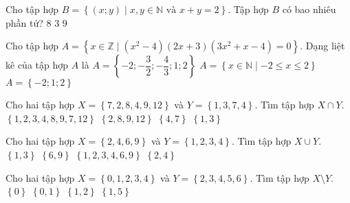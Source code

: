 \begin{ex}%
	Cho tập hợp $B = \left\{(x;y) \mid  x,y \in \mathbb{N}  \text{ và } x+y= 2\right\}$. Tập hợp $B$ có bao nhiêu phần tử?
	{$8$}
	{\True $3$}
	{$9$}
\end{ex}

\begin{ex}%
	Cho tập hợp $A = \left\{x \in \mathbb{Z} \mid (x^2-4)(2x+3)(3x^2+x-4) = 0\right\}$. Dạng liệt kê của tập hợp $A$ là
	{$A  = \left\{-2;-\dfrac{3}{2};-\dfrac{4}{3};1;2\right\} $}
	{$A  = \left\{x \in \mathbb{N} \mid -2 \le x \le 2 \right\} $}
	{\True $A  = \left\{-2;1;2\right\} $}
\end{ex}

\begin{ex}%
	Cho hai tập hợp $X=\left\{ 7, 2, 8, 4, 9, 12 \right\}$ và $Y=\left\{ 1, 3, 7, 4 \right\}$. Tìm tập hợp $X\cap Y$.
	\choice
	{$\left\{ 1, 2, 3, 4, 8, 9, 7, 12 \right\}$}
	{$\left\{ 2, 8, 9, 12 \right\}$}
	{\True $\left\{ 4, 7 \right\}$}
	{$\left\{ 1, 3 \right\}$}
\end{ex}

\begin{ex}%
	Cho hai tập hợp $X=\left\{ 2, 4, 6, 9 \right\}$ và $Y=\left\{ 1, 2, 3, 4 \right\}$. Tìm tập hợp $X \cup Y$.
	\choice
	{$\left\{1, 3 \right\}$	}
	{$\left\{6, 9 \right\}$}
	{\True $\left\{1, 2, 3, 4, 6, 9 \right\}$}
	{$\left\{2, 4 \right\}$}
\end{ex}

\begin{ex}%
	Cho hai tập hợp $X=\left\{0, 1, 2, 3, 4\right\}$ và $Y=\left\{ 2, 3, 4, 5, 6 \right\}$. Tìm tập hợp $X\setminus Y$.
	\choice
	{$\left\{ 0 \right\}$}
	{\True $\left\{ 0, 1 \right\}$}
	{$\left\{ 1, 2 \right\}$}
	{$\left\{ 1, 5 \right\}$}
\end{ex}

